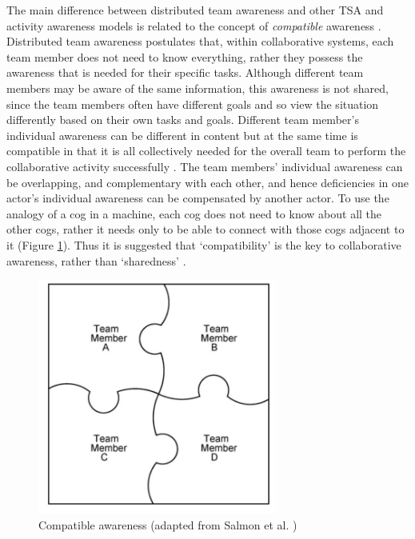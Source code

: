 The main difference between distributed team awareness and other TSA and activity awareness models is related to the concept of \emph{compatible} awareness \cite{Stanton2009}. Distributed team awareness postulates that, within collaborative systems, each team member does not need to know everything, rather they possess the awareness that is needed for their specific tasks. Although different team members may be aware of the same information, this awareness is not shared, since the team members often have different goals and so view the situation differently based on their own tasks and goals. Different team member's individual awareness can be different in content but at the same time is compatible in that it is all collectively needed for the overall team to perform the collaborative activity successfully \cite{Salmon2010}. The team members' individual awareness can be overlapping, and complementary with each other, and hence deficiencies in one actor's individual awareness can be compensated by another actor. To use the analogy of a cog in a machine, each cog does not need to know about all the other cogs, rather it needs only to be able to connect with those cogs adjacent to it (Figure \ref{fig:compatible_awareness}). Thus it is suggested that `compatibility' is the key to collaborative awareness, rather than `sharedness' \cite{Salmon2008a}.

\begin{figure}[htbp] %
   \centering
   \includegraphics[width=3.1in]{compatible_awareness.jpg} 
   \caption{Compatible awareness (adapted from Salmon et al. \cite{Stanton2009})}
   \label{fig:compatible_awareness}
\end{figure}

